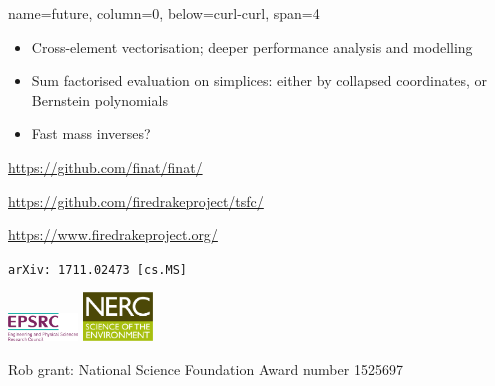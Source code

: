 \documentclass[a0paper,portrait]{baposter}
\newcommand{\fitCurve}[4]{%
  \pgfplotstablegetelem{#2}{C}\of#1
  \pgfmathsetmacro{#3}{\pgfplotsretval}
  \pgfplotstablegetelem{#2}{a}\of#1
  \pgfmathsetmacro{\a}{\pgfplotsretval}
  \pgfplotstablegetelem{#2}{b}\of#1
  \pgfmathsetmacro{\b}{\pgfplotsretval}
  \addplot[densely dashdotted,domain=\a:\b] {#4};
}
\begin{document}
\begin{poster}
{
  }

  {name=future, column=0, below=curl-curl, span=4}
  {
    \begin{itemize}
    \item Cross-element vectorisation; deeper performance analysis and
      modelling
    \item Sum factorised evaluation on simplices: either by collapsed
      coordinates, or Bernstein polynomials
    \item Fast mass inverses?
    \end{itemize}

    \url{https://github.com/finat/finat/}

    \url{https://github.com/firedrakeproject/tsfc/}

    \url{https://www.firedrakeproject.org/}

    \texttt{arXiv: 1711.02473 [cs.MS]}

    \includegraphics[width=5em]{epsrc-logo}
    \includegraphics[width=5em]{nerc-logo}

    Rob grant: National Science Foundation Award number 1525697

  }
\end{poster}
\end{document}
